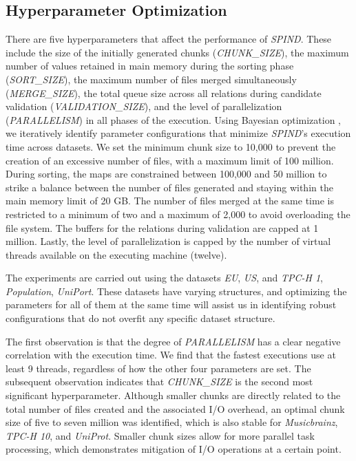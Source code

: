 \subsection{Hyperparameter Optimization}\label{subsec:hyperparameters}

There are five hyperparameters that affect the performance of \textit{SPIND}. These include the size of the initially generated chunks (\textit{CHUNK\_SIZE}), the maximum number of values retained in main memory during the sorting phase (\textit{SORT\_SIZE}), the maximum number of files merged simultaneously (\textit{MERGE\_SIZE}), the total queue size across all relations during candidate validation (\textit{VALIDATION\_SIZE}), and the level of parallelization (\textit{PARALLELISM}) in all phases of the execution. Using Bayesian optimization \cite{shahriari2015taking}, we iteratively identify parameter configurations that minimize \textit{SPIND}'s execution time across datasets. We set the minimum chunk size to 10,000 to prevent the creation of an excessive number of files, with a maximum limit of 100 million. During sorting, the maps are constrained between 100,000 and 50 million to strike a balance between the number of files generated and staying within the main memory limit of 20 GB. The number of files merged at the same time is restricted to a minimum of two and a maximum of 2,000 to avoid overloading the file system. The buffers for the relations during validation are capped at 1 million. Lastly, the level of parallelization is capped by the number of virtual threads available on the executing machine (twelve).

The experiments are carried out using the datasets \textit{EU}, \textit{US}, and \textit{TPC-H 1}, \textit{Population}, \textit{UniPort}. These datasets have varying structures, and optimizing the parameters for all of them at the same time will assist us in identifying robust configurations that do not overfit any specific dataset structure. 

The first observation is that the degree of \textit{PARALLELISM} has a clear negative correlation with the execution time. We find that the fastest executions use at least 9 threads, regardless of how the other four parameters are set. The subsequent observation indicates that \textit{CHUNK\_SIZE} is the second most significant hyperparameter. Although smaller chunks are directly related to the total number of files created and the associated I/O overhead, an optimal chunk size of five to seven million was identified, which is also stable for \textit{Musicbrainz}, \textit{TPC-H 10}, and \textit{UniProt}. Smaller chunk sizes allow for more parallel task processing, which demonstrates mitigation of I/O operations at a certain point.

